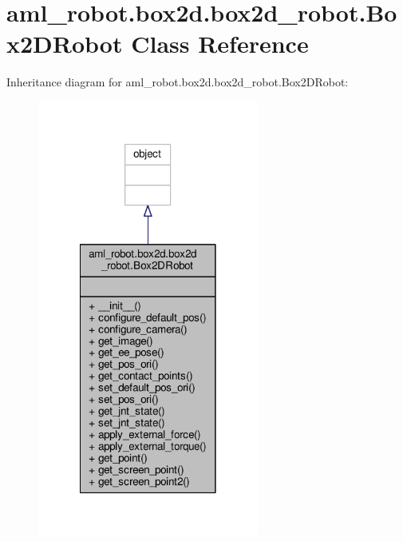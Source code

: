\hypertarget{classaml__robot_1_1box2d_1_1box2d__robot_1_1_box2_d_robot}{\section{aml\-\_\-robot.\-box2d.\-box2d\-\_\-robot.\-Box2\-D\-Robot Class Reference}
\label{classaml__robot_1_1box2d_1_1box2d__robot_1_1_box2_d_robot}
}


Inheritance diagram for aml\-\_\-robot.\-box2d.\-box2d\-\_\-robot.\-Box2\-D\-Robot\-:
\nopagebreak
\begin{figure}[H]
\begin{center}
\leavevmode
\includegraphics[width=206pt]{classaml__robot_1_1box2d_1_1box2d__robot_1_1_box2_d_robot__inherit__graph}
\end{center}
\end{figure}


